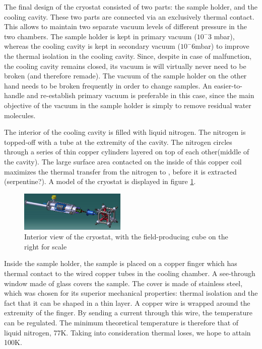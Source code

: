\documentclass[journal]{IEEEtran}
\begin{document}
The final design of the cryostat consisted of two parts: the sample holder, and the cooling cavity. These two parts are connected via an exclusively thermal contact. This allows to maintain two separate vacuum levels of different pressure in the two chambers. The sample holder is kept in primary vacuum ($10^-3$ mbar), whereas the cooling cavity is kept in secondary vacuum ($10^-6$mbar) to improve the thermal isolation in the cooling cavity. Since, despite in case of malfunction, the cooling cavity remains closed, its vacuum is will virtually never need to be broken (and therefore remade). The vacuum of the sample holder on the other hand needs to be broken frequently in order to change samples. An easier-to-handle and re-establish primary vacuum is preferable in this case, since the main objective of the vacuum in the sample holder is simply to remove residual water molecules.


The interior of the cooling cavity is filled with liquid nitrogen. The nitrogen is topped-off with a tube at the extremity of the cavity. The nitrogen circles through a series of thin copper cylinders layered on top of each other(middle of the cavity). The large surface area contacted on the inside of this copper coil maximizes the thermal transfer from the nitrogen to , before it is extracted (serpentine?). A model of the cryostat is displayed in figure \ref{f cryostat}.

\begin{figure}[h]
\includegraphics[width=0.45\textwidth]{Cryo_1.jpg}
\caption{Interior view of the cryostat, with the field-producing cube on the right for scale}
\label{f cryostat}
\end{figure}

Inside the sample holder, the sample is placed on a copper finger which has thermal contact to the wired copper tubes in the cooling chamber. A see-through window made of glass covers the sample. The cover is made of stainless steel, which was chosen for its superior mechanical properties: thermal isolation and the fact that it can be shaped in a thin layer. A copper wire is wrapped around the extremity of the finger. By sending a current through this wire, the temperature can be regulated. The minimum theoretical temperature is therefore that of liquid nitrogen, 77K. Taking into consideration thermal loses, we hope to attain 100K.
\end{document}
